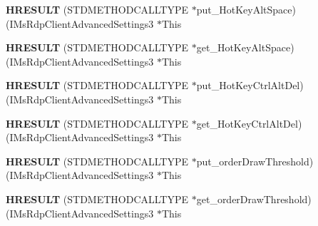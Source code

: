 \begin{DoxyCompactItemize}
\item 
\mbox{\label{struct_i_ms_rdp_client_advanced_settings3_vtbl_ae22b3f6609bb89089d7688aed3a8072a}} 
{\bfseries H\+R\+E\+S\+U\+LT} (S\+T\+D\+M\+E\+T\+H\+O\+D\+C\+A\+L\+L\+T\+Y\+PE $\ast$put\+\_\+\+Hot\+Key\+Alt\+Space)(I\+Ms\+Rdp\+Client\+Advanced\+Settings3 $\ast$This
\item 
\mbox{\label{struct_i_ms_rdp_client_advanced_settings3_vtbl_aca5737784271b7b9d727f5917750f418}} 
{\bfseries H\+R\+E\+S\+U\+LT} (S\+T\+D\+M\+E\+T\+H\+O\+D\+C\+A\+L\+L\+T\+Y\+PE $\ast$get\+\_\+\+Hot\+Key\+Alt\+Space)(I\+Ms\+Rdp\+Client\+Advanced\+Settings3 $\ast$This
\item 
\mbox{\label{struct_i_ms_rdp_client_advanced_settings3_vtbl_a06cd998e5e380fc3dc2f85c09c84dbb3}} 
{\bfseries H\+R\+E\+S\+U\+LT} (S\+T\+D\+M\+E\+T\+H\+O\+D\+C\+A\+L\+L\+T\+Y\+PE $\ast$put\+\_\+\+Hot\+Key\+Ctrl\+Alt\+Del)(I\+Ms\+Rdp\+Client\+Advanced\+Settings3 $\ast$This
\item 
\mbox{\label{struct_i_ms_rdp_client_advanced_settings3_vtbl_a2930b228cd5674189027e6e933d3494d}} 
{\bfseries H\+R\+E\+S\+U\+LT} (S\+T\+D\+M\+E\+T\+H\+O\+D\+C\+A\+L\+L\+T\+Y\+PE $\ast$get\+\_\+\+Hot\+Key\+Ctrl\+Alt\+Del)(I\+Ms\+Rdp\+Client\+Advanced\+Settings3 $\ast$This
\item 
\mbox{\label{struct_i_ms_rdp_client_advanced_settings3_vtbl_aec484a238278b3ce28c87f66b24cb347}} 
{\bfseries H\+R\+E\+S\+U\+LT} (S\+T\+D\+M\+E\+T\+H\+O\+D\+C\+A\+L\+L\+T\+Y\+PE $\ast$put\+\_\+order\+Draw\+Threshold)(I\+Ms\+Rdp\+Client\+Advanced\+Settings3 $\ast$This
\item 
\mbox{\label{struct_i_ms_rdp_client_advanced_settings3_vtbl_a2e48ffee89021b283c7320b77da132b9}} 
{\bfseries H\+R\+E\+S\+U\+LT} (S\+T\+D\+M\+E\+T\+H\+O\+D\+C\+A\+L\+L\+T\+Y\+PE $\ast$get\+\_\+order\+Draw\+Threshold)(I\+Ms\+Rdp\+Client\+Advanced\+Settings3 $\ast$This
\item 
\mbox{\label{struct_i_ms_rdp_client_advanced_settings3_vtbl_a604755e6ab1474d5dd4305b3d54adf46}} 

\end{DoxyCompactItemize}
